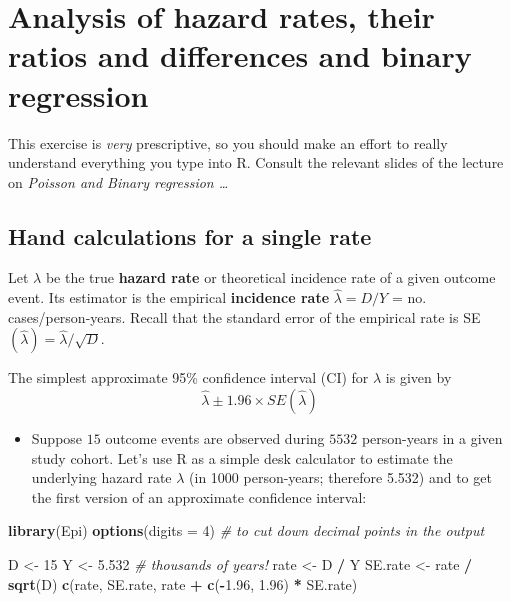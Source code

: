 \documentclass[
]{book}
\newenvironment{Shaded}{\begin{snugshade}}{\end{snugshade}}
\newcommand{\AttributeTok}[1]{\textcolor[rgb]{0.13,0.29,0.53}{#1}}
\newcommand{\CommentTok}[1]{\textcolor[rgb]{0.56,0.35,0.01}{\textit{#1}}}
\newcommand{\DecValTok}[1]{\textcolor[rgb]{0.00,0.00,0.81}{#1}}
\newcommand{\FloatTok}[1]{\textcolor[rgb]{0.00,0.00,0.81}{#1}}
\newcommand{\FunctionTok}[1]{\textcolor[rgb]{0.13,0.29,0.53}{\textbf{#1}}}
\newcommand{\NormalTok}[1]{#1}
\newcommand{\OtherTok}[1]{\textcolor[rgb]{0.56,0.35,0.01}{#1}}
\newcommand{\SpecialCharTok}[1]{\textcolor[rgb]{0.81,0.36,0.00}{\textbf{#1}}}
\providecommand{\tightlist}{%
  \setlength{\itemsep}{0pt}\setlength{\parskip}{0pt}}
\begin{document}
\chapter{Analysis of hazard rates, their ratios and differences and binary regression}\label{analysis-of-hazard-rates-their-ratios-and-differences-and-binary-regression}

This exercise is \emph{very} prescriptive, so you should make an
effort to really understand everything you type into R. Consult the
relevant slides of the lecture on \emph{Poisson and Binary regression \ldots{}}

\section{Hand calculations for a single rate}\label{hand-calculations-for-a-single-rate}

Let \(\lambda\) be the true \textbf{hazard rate} or theoretical incidence rate of a given outcome event.
Its estimator is the empirical \textbf{incidence rate}
\(\widehat\lambda = D/Y\) = no. cases/person-years. Recall that the
standard error of the empirical rate is
SE\((\widehat\lambda) = \widehat\lambda/\sqrt{D}\).

The simplest approximate 95\% confidence interval (CI) for \(\lambda\)
is given by
\[ \widehat\lambda \pm 1.96 \times SE(\widehat\lambda) \]

\begin{itemize}
\tightlist
\item
  Suppose \(15\) outcome events are observed during \(5532\) person-years in a given study cohort.
  Let's use R as a simple desk calculator to estimate the underlying hazard rate \(\lambda\) (in 1000
  person-years; therefore 5.532) and to get the first version of an approximate confidence
  interval:
\end{itemize}

\begin{Shaded}
\begin{Highlighting}[]
\FunctionTok{library}\NormalTok{(Epi)}
\FunctionTok{options}\NormalTok{(}\AttributeTok{digits =} \DecValTok{4}\NormalTok{) }\CommentTok{\#  to cut down decimal points in the output}
\end{Highlighting}
\end{Shaded}

\begin{Shaded}
\begin{Highlighting}[]
\NormalTok{D }\OtherTok{\textless{}{-}} \DecValTok{15}
\NormalTok{Y }\OtherTok{\textless{}{-}} \FloatTok{5.532} \CommentTok{\# thousands of years!}
\NormalTok{rate }\OtherTok{\textless{}{-}}\NormalTok{ D }\SpecialCharTok{/}\NormalTok{ Y}
\NormalTok{SE.rate }\OtherTok{\textless{}{-}}\NormalTok{ rate }\SpecialCharTok{/} \FunctionTok{sqrt}\NormalTok{(D)}
\FunctionTok{c}\NormalTok{(rate, SE.rate, rate }\SpecialCharTok{+} \FunctionTok{c}\NormalTok{(}\SpecialCharTok{{-}}\FloatTok{1.96}\NormalTok{, }\FloatTok{1.96}\NormalTok{) }\SpecialCharTok{*}\NormalTok{ SE.rate)}
\end{Highlighting}
\end{Shaded}
\end{document}
